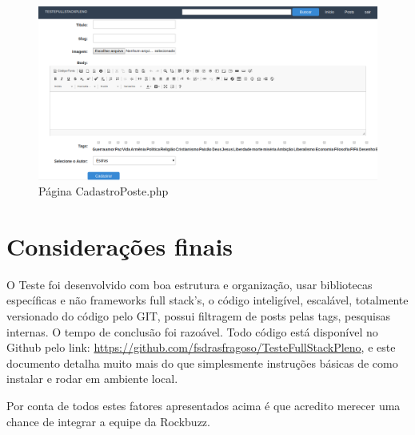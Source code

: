 \documentclass[
	article,			%
	11pt,				%
	oneside,			%
	a4paper,			%
	english,			%
	brazil,				%
	sumario=tradicional
	]{abntex2}
\begin{document}
\begin{figure} [h!]
  \centering
    \caption{Página CadastroPoste.php}
  \label{cadatroPoste}
    \includegraphics[scale=0.3]{cadastroPoste.png}
       
\end{figure} 

% 

\section*{Considerações finais}
O Teste foi desenvolvido com boa estrutura e organização, usar bibliotecas específicas e não frameworks full stack's, o código inteligível, escalável, totalmente  versionado do código pelo GIT, possui  filtragem de posts pelas tags, pesquisas internas. O tempo de conclusão foi razoável. Todo  código está disponível no Github pelo link: \url{https://github.com/fsdrasfragoso/TesteFullStackPleno}, e este documento detalha muito mais do que simplesmente instruções básicas de como instalar e rodar em ambiente local. 

Por conta de todos estes fatores apresentados acima é que acredito merecer uma chance de integrar a equipe da Rockbuzz. 


\end{document}
